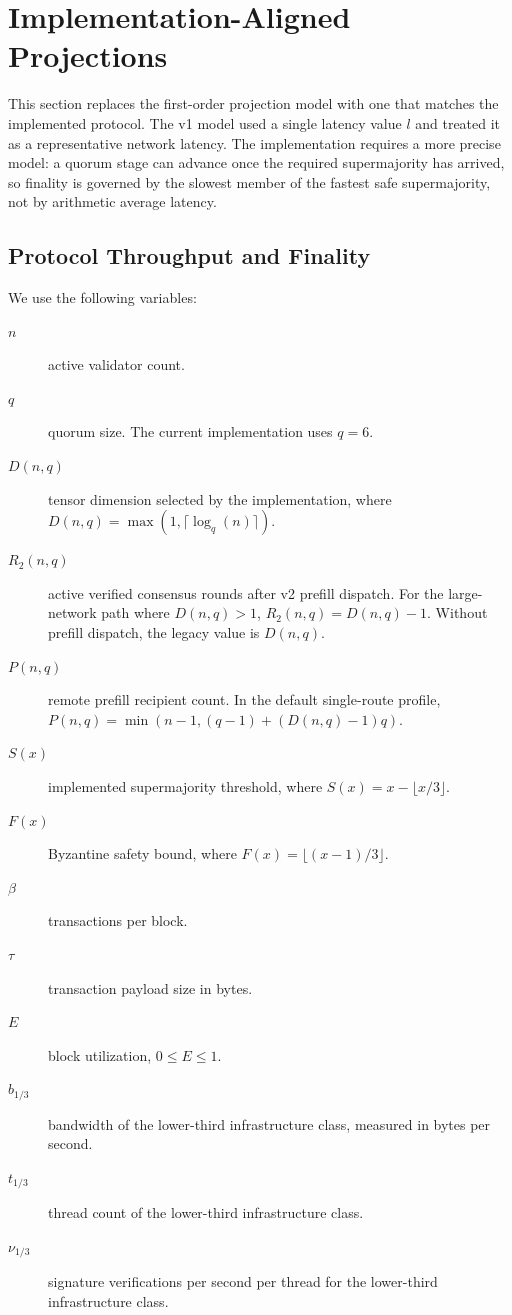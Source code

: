 \section{Implementation-Aligned Projections}\label{proj}

This section replaces the first-order projection model with one that matches
the implemented protocol. The v1 model used a single latency value \(l\) and
treated it as a representative network latency. The implementation requires a
more precise model: a quorum stage can advance once the required
supermajority has arrived, so finality is governed by the slowest member of
the fastest safe supermajority, not by arithmetic average latency.

\subsection{Protocol Throughput and Finality}\label{proj:tps}

We use the following variables:

\begin{description}
\item[\(n\)] active validator count.
\item[\(q\)] quorum size. The current implementation uses \(q=6\).
\item[\(D(n,q)\)] tensor dimension selected by the implementation, where
\(D(n,q)=\max(1,\lceil \log_q(n)\rceil)\).
\item[\(R_2(n,q)\)] active verified consensus rounds after v2 prefill
dispatch. For the large-network path where \(D(n,q)>1\),
\(R_2(n,q)=D(n,q)-1\). Without prefill dispatch, the legacy value is
\(D(n,q)\).
\item[\(P(n,q)\)] remote prefill recipient count. In the default single-route
profile, \(P(n,q)=\min(n-1,(q-1)+(D(n,q)-1)q)\).
\item[\(S(x)\)] implemented supermajority threshold, where
\(S(x)=x-\lfloor x/3 \rfloor\).
\item[\(F(x)\)] Byzantine safety bound, where
\(F(x)=\lfloor (x-1)/3 \rfloor\).
\item[\(\beta\)] transactions per block.
\item[\(\tau\)] transaction payload size in bytes.
\item[\(E\)] block utilization, \(0 \le E \le 1\).
\item[\(b_{1/3}\)] bandwidth of the lower-third infrastructure class, measured
in bytes per second.
\item[\(t_{1/3}\)] thread count of the lower-third infrastructure class.
\item[\(\nu_{1/3}\)] signature verifications per second per thread for the
lower-third infrastructure class.
\end{description}

